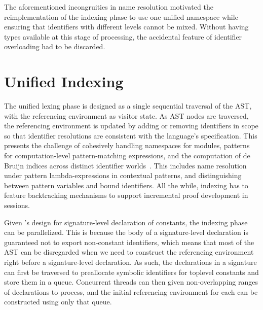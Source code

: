 The aforementioned incongruities in name resolution motivated the reimplementation of the indexing phase to use one unified namespace while ensuring that identifiers with different levels cannot be mixed.
Without having types available at this stage of processing, the accidental feature of identifier overloading had to be discarded.



\section{Unified Indexing}\label{section:indexing}


The unified lexing phase is designed as a single sequential traversal of the \ac{AST}, with the referencing environment as visitor state.
As \ac{AST} nodes are traversed, the referencing environment is updated by adding or removing identifiers in scope so that identifier resolutions are consistent with the language's specification.
This presents the challenge of cohesively handling namespaces for modules, patterns for computation-level pattern-matching expressions, and the computation of de Bruijn indices across distinct identifier worlds~\cite{ferreira2012compiler}.
This includes name resolution under pattern lambda-expressions in contextual \LF patterns, and distinguishing between pattern variables and bound identifiers.
All the while, indexing has to feature backtracking mechanisms to support incremental proof development in \Harpoon sessions.




Given \Beluga's design for signature-level declaration of constants, the indexing phase can be parallelized.
This is because the body of a signature-level declaration is guaranteed not to export non-constant identifiers, which means that most of the \ac{AST} can be disregarded when we need to construct the referencing environment right before a signature-level declaration.
As such, the declarations in a signature can first be traversed to preallocate symbolic identifiers for toplevel constants and store them in a queue.
Concurrent threads can then given non-overlapping ranges of declarations to process, and the initial referencing environment for each can be constructed using only that queue.

